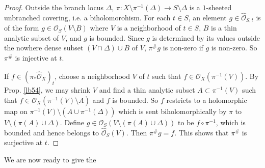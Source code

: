 \documentclass[12pt,b5paper,notitlepage]{report}
\theoremstyle{definition}
\theoremstyle{plain}
\newcommand{\scr}{\mathscr}
\newcommand{\Owht}{\widehat{\scr O}}
\numberwithin{equation}{section}
\begin{document}
\begin{proof}
Outside the branch locus $\Delta$, $\pi:X\setminus\pi^{-1}(\Delta)\rightarrow S\setminus\Delta$ is a $1$-sheeted unbranched covering, i.e. a biholomorohism. For each $t\in S$, an element $g\in\Owht_{S,t}$ is of the form $g\in\scr O_S(V\setminus B)$ where $V$ is a neighborhood of $t\in S$, $B$ is a thin analytic subset of $V$, and $g$ is bounded. Since $g$ is determined by its values outside the nowhere dense subset $(V\cap\Delta)\cup B$ of $V$, $\pi^\#g$ is non-zero if $g$ is non-zero. So $\pi^\#$ is injective at $t$.

If $f\in(\pi_*\Owht_X)_t$,  choose a neighborhood $V$ of $t$ such that $f\in\Owht_X(\pi^{-1}(V))$. By Prop. \ref{lb54}, we may shrink $V$ and find a thin analytic subset $A\subset\pi^{-1}(V)$ such that $f\in\scr O_X(\pi^{-1}(V)\setminus A)$ and $f$ is bounded. So $f$ restricts to a holomorphic map on $\pi^{-1}(V)\setminus(A\cup\pi^{-1}(\Delta))$ which is sent biholomorphically by $\pi$ to $V\setminus (\pi(A)\cup \Delta)$. Define $g\in\scr O_S(V\setminus(\pi(A)\cup\Delta))$ to be $f\circ\pi^{-1}$, which is bounded and hence belongs to $\Owht_S(V)$. Then $\pi^\#g=f$. This shows that $\pi^\#$ is surjective at $t$.
\end{proof}



We are now ready to give the
\end{document}

